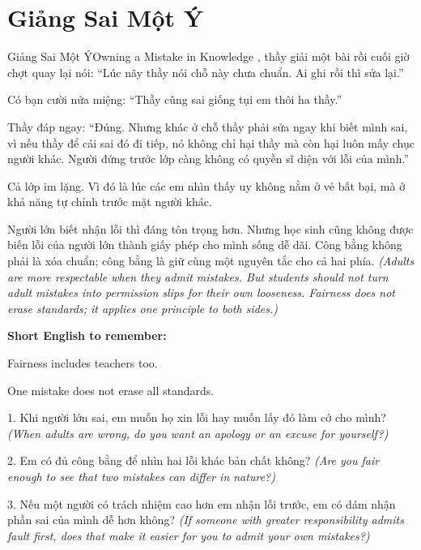 \section{Giảng Sai Một Ý}
\begin{truyen}{Giảng Sai Một Ý}{Owning a Mistake in Knowledge}
, thầy giải một bài rồi cuối giờ chợt quay lại nói: ``Lúc nãy thầy nói chỗ này chưa chuẩn. Ai ghi rồi thì sửa lại.''

Có bạn cười nửa miệng: ``Thầy cũng sai giống tụi em thôi ha thầy.''

Thầy đáp ngay: ``Đúng. Nhưng khác ở chỗ thầy phải sửa ngay khi biết mình sai, vì nếu thầy để cái sai đó đi tiếp, nó không chỉ hại thầy mà còn hại luôn mấy chục người khác. Người đứng trước lớp càng không có quyền sĩ diện với lỗi của mình.''

Cả lớp im lặng. Vì đó là lúc các em nhìn thấy uy không nằm ở vẻ bất bại, mà ở khả năng tự chỉnh trước mặt người khác.
\end{truyen}

\begin{baihoc}
Người lớn biết nhận lỗi thì đáng tôn trọng hơn. Nhưng học sinh cũng không được biến lỗi của người lớn thành giấy phép cho mình sống dễ dãi. Công bằng không phải là xóa chuẩn; công bằng là giữ cùng một nguyên tắc cho cả hai phía.
\textit{(Adults are more respectable when they admit mistakes. But students should not turn adult mistakes into permission slips for their own looseness. Fairness does not erase standards; it applies one principle to both sides.)}
\end{baihoc}

\begin{ghinhoanh}
\textbf{Short English to remember:}

Fairness includes teachers too.

One mistake does not erase all standards.
\end{ghinhoanh}

\begin{tuhocnhanh}
1. Khi người lớn sai, em muốn họ xin lỗi hay muốn lấy đó làm cớ cho mình? \textit{(When adults are wrong, do you want an apology or an excuse for yourself?)}

2. Em có đủ công bằng để nhìn hai lỗi khác bản chất không? \textit{(Are you fair enough to see that two mistakes can differ in nature?)}

3. Nếu một người có trách nhiệm cao hơn em nhận lỗi trước, em có dám nhận phần sai của mình dễ hơn không? \textit{(If someone with greater responsibility admits fault first, does that make it easier for you to admit your own mistakes?)}
\end{tuhocnhanh}

